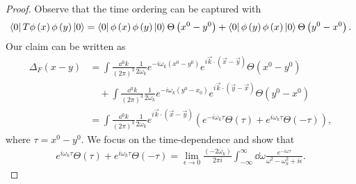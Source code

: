 \begin{proof}
    Observe that the time ordering can be captured with
    \begin{align}
        \bra{0} T \phi \left( x \right) \phi \left( y \right) \ket{0} = \bra{0} \phi \left( x \right) \phi \left( y \right) \ket{0}  \Theta \left( x^{0} - y^{0} \right) + \bra{0} \phi \left( y \right) \phi \left( x \right) \ket{0} \Theta \left( y^{0} - x^{0} \right) 
    .\end{align}
    Our claim can be written as
    \begin{align}
        \Delta_F \left( x -y \right) &= \int \frac{\dd{^{3}k}}{\left( 2\pi \right)^{3}} \frac{1}{2 \omega_k} e^{- i \omega_k \left( x^{0} - y^{0} \right) } e^{i \vec{k} \cdot \left( \vec{x} - \vec{y} \right) } \Theta \left( x^{0} - y^{0} \right)\nonumber\\
                                     &\quad+ \int \frac{\dd{^{3}k}}{\left( 2\pi \right)^{3}} \frac{1}{2 \omega_k} e^{- i \omega_k \left( y^{0} - x_0 \right) } e^{i \vec{k} \cdot \left( \vec{y} - \vec{x} \right) } \Theta \left( y^{0} - x^{0} \right)   \\
        &= \int \frac{\dd{^3k}}{\left( 2\pi \right)^3} \frac{1}{2 \omega_k} e^{i \vec{k} \cdot \left( \vec{x} - \vec{y} \right) } \left( e^{-i \omega_k \tau} \Theta \left( \tau \right) + e^{i \omega_k \tau} \Theta \left( -\tau \right) \right)
    ,\end{align}
    where $\tau = x^{0} - y^{0}$.  We focus on the time-dependence and show that
    \begin{align}
        e^{i \omega_k \tau} \Theta \left( \tau \right) + e^{i \omega_k \tau} \Theta \left( -\tau \right) = \lim_{\epsilon \to 0} \frac{\left( -2 \omega_k \right) }{2\pi i} \int_{-\infty}^{\infty} \dd{\omega} \frac{e^{-i \omega \tau}}{\omega^2 - \omega^2_k + i \epsilon} 
    .\end{align}


\end{proof}
